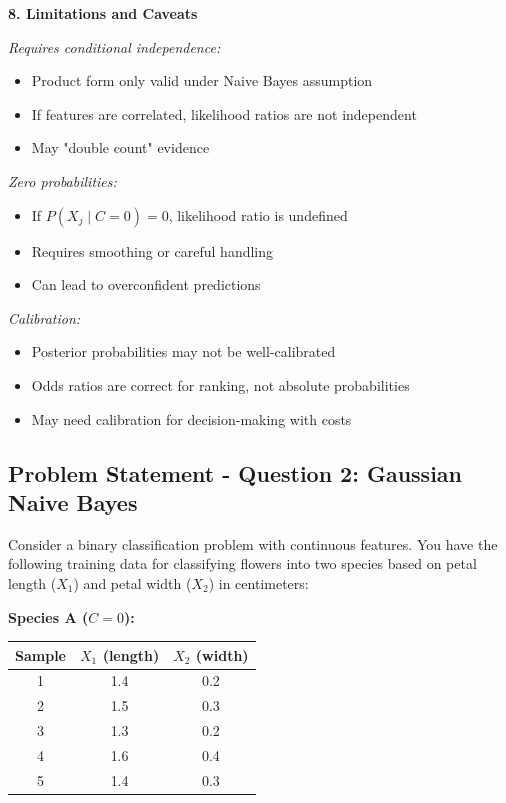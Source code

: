 \documentclass[12pt]{article}
\begin{document}
\begin{explanation}
\textbf{8. Limitations and Caveats}

\textit{Requires conditional independence:}
\begin{itemize}
    \item Product form only valid under Naive Bayes assumption
    \item If features are correlated, likelihood ratios are not independent
    \item May "double count" evidence
\end{itemize}

\textit{Zero probabilities:}
\begin{itemize}
    \item If $P(X_j \mid C=0) = 0$, likelihood ratio is undefined
    \item Requires smoothing or careful handling
    \item Can lead to overconfident predictions
\end{itemize}

\textit{Calibration:}
\begin{itemize}
    \item Posterior probabilities may not be well-calibrated
    \item Odds ratios are correct for ranking, not absolute probabilities
    \item May need calibration for decision-making with costs
\end{itemize}
\end{explanation}

\newpage
\subsection{Problem Statement - Question 2: Gaussian Naive Bayes}

Consider a binary classification problem with continuous features. You have the following training data for classifying flowers into two species based on petal length ($X_1$) and petal width ($X_2$) in centimeters:

\textbf{Species A ($C = 0$):}
\begin{center}
\begin{tabular}{|c|c|c|}
\hline
\textbf{Sample} & $X_1$ (length) & $X_2$ (width) \\
\hline
1 & 1.4 & 0.2 \\
2 & 1.5 & 0.3 \\
3 & 1.3 & 0.2 \\
4 & 1.6 & 0.4 \\
5 & 1.4 & 0.3 \\
\hline
\end{tabular}
\end{center}
\end{document}
